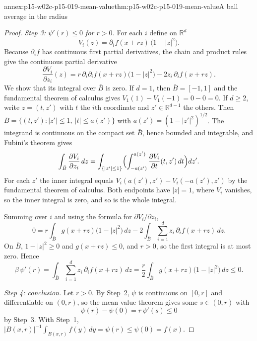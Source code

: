\begin{annexitem}{annex:p15-w02c-p15-019-mean-value}{thm:p15-w02c-p15-019-mean-value}{A ball average in the radius}
\begin{proof}
\emph{Step 3: \(\psi'(r)\leq0\) for \(r>0\).} For each \(i\) define on
\(\mathbb R^d\)
\[
             V_i(z)=\partial_if(x+rz)\,\bigl(1-|z|^2\bigr).
\]
Because \(\partial_if\) has continuous first partial derivatives, the
chain and product rules give the continuous partial derivative
\[
  \frac{\partial V_i}{\partial z_i}(z)
     =r\,\partial_i\partial_if(x+rz)\bigl(1-|z|^2\bigr)
       -2z_i\,\partial_if(x+rz).
\]
We show that its integral over \(\bar B\) is zero. If \(d=1\), then
\(\bar B=[-1,1]\) and the fundamental theorem of calculus gives
\(V_1(1)-V_1(-1)=0-0=0\). If \(d\geq2\), write \(z=(t,z')\) with \(t\)
the \(i\)th coordinate and \(z'\in\mathbb R^{d-1}\) the others. Then
\(\bar B=\{(t,z'):|z'|\leq1,\ |t|\leq a(z')\}\) with
\(a(z')=(1-|z'|^2)^{1/2}\). The integrand is continuous on the compact
set \(\bar B\), hence bounded and integrable, and Fubini's theorem gives
\[
 \int_{\bar B}\frac{\partial V_i}{\partial z_i}\,dz
   =\int_{\{|z'|\leq1\}}\Bigl(\int_{-a(z')}^{a(z')}
        \frac{\partial V_i}{\partial t}(t,z')\,dt\Bigr)dz' .
\]
For each \(z'\) the inner integral equals
\(V_i(a(z'),z')-V_i(-a(z'),z')\) by the fundamental theorem of
calculus. Both endpoints have \(|z|=1\), where \(V_i\) vanishes, so the
inner integral is zero, and so is the whole integral.

Summing over \(i\) and using the formula for
\(\partial V_i/\partial z_i\),
\[
 0=r\int_{\bar B}g(x+rz)\bigl(1-|z|^2\bigr)\,dz
   -2\int_{\bar B}\sum_{i=1}^dz_i\,\partial_if(x+rz)\,dz .
\]
On \(\bar B\), \(1-|z|^2\geq0\) and \(g(x+rz)\leq0\), and \(r>0\), so
the first integral is at most zero. Hence
\[
   \beta\,\psi'(r)=\int_{\bar B}\sum_{i=1}^dz_i\,\partial_if(x+rz)\,dz
      =\frac r2\int_{\bar B}g(x+rz)\bigl(1-|z|^2\bigr)\,dz\leq0 .
\]

\emph{Step 4: conclusion.} Let \(r>0\). By Step~2, \(\psi\) is continuous
on \([0,r]\) and differentiable on \((0,r)\), so the mean value theorem
gives some \(s\in(0,r)\) with
\[
          \psi(r)-\psi(0)=r\,\psi'(s)\leq0
\]
by Step~3. With Step~1,
\(|B(x,r)|^{-1}\int_{B(x,r)}f(y)\,dy=\psi(r)\leq\psi(0)=f(x)\).
\end{proof}
\end{annexitem}

